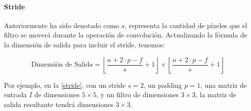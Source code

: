                 \paragraph{Stride}
                    Anteriormente ha sido denotado como \( s \), representa la cantidad de píxeles que el filtro se moverá durante la operación de convolución. Actualizando la fórmula de la dimensión de salida para incluir el stride, tenemos:
                    
                    \begin{equation}
                        \text{Dimensión de Salida} = \left\lfloor \frac{n + 2 \cdot p - f}{s} + 1 \right\rfloor \times \left\lfloor \frac{n + 2 \cdot p - f}{s} + 1 \right\rfloor
                    \end{equation}
                    
                    Por ejemplo, en la \autoref{stride}, con un stride \( s = 2 \), un padding \( p = 1 \), una matriz de entrada \( I \) de dimensiones \( 5 \times 5 \), y un filtro de dimensiones \( 3 \times 3 \), la matriz de salida resultante tendrá dimensiones \( 3 \times 3 \).
                    
